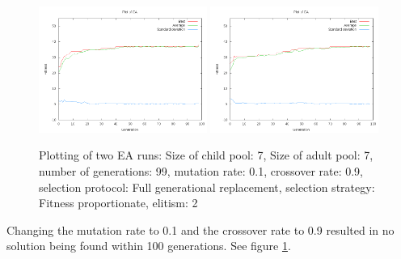 \documentclass[11pt]{article}
\begin{document}
\begin{figure}[ht]
\begin{center}
\mbox{\includegraphics[width=0.49\textwidth]{images/21.png}}
\mbox{\includegraphics[width=0.49\textwidth]{images/22.png}}
\end{center}
\caption{Plotting of two EA runs:
Size of child pool: 7,
Size of adult pool: 7,
number of generations: 99,
mutation rate: 0.1,
crossover rate: 0.9,
selection protocol: Full generational replacement,
selection strategy: Fitness proportionate,
elitism: 2}
\label{fig:2}
\end{figure}

Changing the mutation rate to 0.1 and the crossover rate to 0.9 resulted in no solution
being found within 100 generations. See figure \ref{fig:2}.
\end{document}
